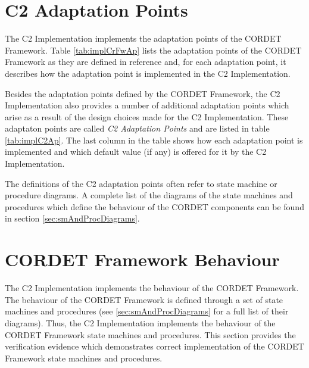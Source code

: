 \documentclass{pnp_article}
\begin{document}
\section{C2 Adaptation Points}\label{sec:implC2Ap}
The C2 Implementation implements the adaptation points of the CORDET Framework.
Table \ref{tab:implCrFwAp} lists the adaptation points of the CORDET Framework as they are defined in reference \cite{ref:cordetfw} and, for each adaptation point, it describes how the adaptation point is implemented in the C2 Implementation. 

Besides the adaptation points defined by the CORDET Framework, the C2 Implementation also provides a number of additional adaptation points which arise as a result of the design choices made for the C2 Implementation. These adaptaton points are called \textit{C2 Adaptation Points} and are listed in table \ref{tab:implC2Ap}. The last column in the table shows how each adaptation point is implemented and which default value (if any) is offered for it by the C2 Implementation.

The definitions of the C2 adaptation points often refer to state machine or procedure diagrams. A complete list of the diagrams of the state machines and procedures which define the behaviour of the CORDET components can be found in section \ref{sec:smAndProcDiagrams}.

\begin{landscape}


\end{landscape}




\section{CORDET Framework Behaviour}\label{sec:verCrFwBehaviour}
The C2 Implementation implements the behaviour of the CORDET Framework. The behaviour of the CORDET Framework is defined through a set of state machines and procedures (see \ref{sec:smAndProcDiagrams} for a full list of their diagrams). Thus, the C2 Implementation implements the behaviour of the CORDET Framework state machines and procedures. This section provides the verification evidence which demonstrates correct implementation of the CORDET Framework state machines and procedures.  
\end{document}
